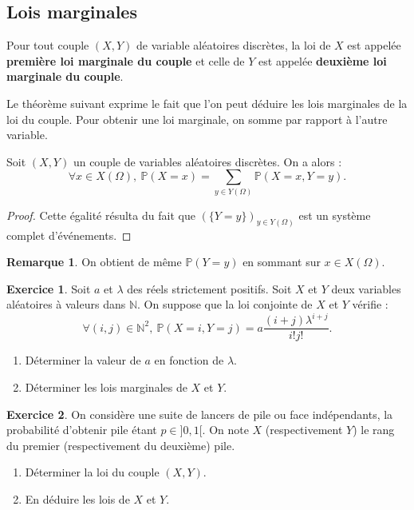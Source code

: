 \documentclass[french]{article}
\renewcommand{\P}{\mathbb{P}}
\newcommand{\N}{\mathbb{N}}
\theoremstyle{plain}
\theoremstyle{definition}
\newtheorem{exo}{Exercice}
\newtheorem*{rmq}{Remarque}
\theoremstyle{remark}
\begin{document}
\subsection{Lois marginales}

\begin{dfn}
	Pour tout couple $(X,Y)$ de variable aléatoires discrètes, la loi de $X$ est appelée \textbf{première loi marginale du couple} et celle de $Y$ est appelée \textbf{deuxième loi marginale du couple}.
\end{dfn}

Le théorème suivant exprime le fait que l'on peut déduire les lois marginales de la loi du couple. Pour obtenir une loi marginale, on somme par rapport à l'autre variable.

\begin{thm}{}%
	Soit $(X,Y)$ un couple de variables aléatoires discrètes. On a alors :
	$$\forall x\in X(\Omega),\ \P(X=x)=\sum_{y\in Y(\Omega)}\P(X=x,Y=y).$$
\end{thm}
\begin{proof}
	Cette égalité résulta du fait que $(\{Y=y\})_{y\in Y(\Omega)}$ est un système complet d'événements.
\end{proof}

\begin{rmq}
	On obtient de même $\P(Y=y)$ en sommant sur $x\in X(\Omega)$.
\end{rmq}

\begin{exo}
	Soit $a$ et $\lambda$ des réels strictement positifs. Soit $X$ et $Y$ deux variables aléatoires à valeurs dans $\N$. On suppose que la loi conjointe de $X$ et $Y$ vérifie :
	$$\forall (i,j)\in\N^2,\ \P(X=i,Y=j)=a\frac{(i+j)\lambda^{i+j}}{i!j!}.$$
	\begin{enumerate}
		\item Déterminer la valeur de $a$ en fonction de $\lambda$.
		\item Déterminer les lois marginales de $X$ et $Y$.
	\end{enumerate}
\end{exo}

\begin{exo}
	On considère une suite de lancers de pile ou face indépendants, la probabilité d'obtenir pile étant $p\in]0,1[$. On note $X$ (respectivement $Y$) le rang du premier (respectivement du deuxième) pile.
	\begin{enumerate}
		\item Déterminer la loi du couple $(X,Y)$.
		\item En déduire les lois de $X$ et $Y$.
	\end{enumerate}
\end{exo}
\end{document}
